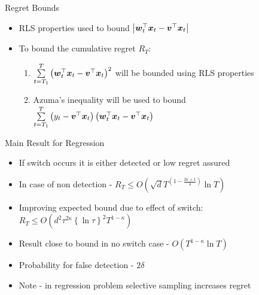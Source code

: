 \documentclass{beamer}
\begin{document}
\begin{frame}{Regret Bounds}
\begin{itemize}
\item RLS properties used to bound $\left\vert{{\boldsymbol{w}}}^{\top}_{t}{\boldsymbol{x}}_{t}-{{\boldsymbol{v}}}^{\top}{\boldsymbol{x}}_{t}\right\vert$\newline
\item To bound the cumulative regret $R_T$:\newline
\begin{enumerate}
\item $\sum\limits_{t=T_1}^{T}\left({{\boldsymbol{w}}}^{\top}_{t}{\boldsymbol{x}}_{t}-{{\boldsymbol{v}}}^{\top}{\boldsymbol{x}}_{t}\right)^2$ will be bounded using RLS properties\newline  
\item Azuma's inequality will be used to bound $\sum\limits_{t=T_1}^{T}\left(y_t-{{\boldsymbol{v}}}^{\top}{\boldsymbol{x}}_{t}\right)\left({{\boldsymbol{w}}}^{\top}_{t}{\boldsymbol{x}}_{t}-{{\boldsymbol{v}}}^{\top}{\boldsymbol{x}}_{t}\right)$
\end{enumerate}
\end{itemize}
\end{frame}

\begin{frame}{Main Result for Regression}
\begin{itemize}
\item If switch occurs it is either detected or low regret assured\newline
\item In case of non detection - $R_T\leq O\left(\sqrt{d}T^{\left(1-\frac{2\kappa+1}{4}\right)}\ln{T}\right)$\newline
\item Improving expected bound due to effect of switch: $R_T\leq O\left(d^2\tau^{2\kappa}\left\{\ln{\tau}\right\}^2T^{1-\kappa}\right)$\newline
\item Result close to bound in no switch case - $O\left(T^{1-\kappa}\ln{T}\right)$\newline
\item Probability for false detection - $2\delta$\newline
\item Note - in regression problem selective sampling increases regret
\end{itemize}
\end{frame}
\end{document}
